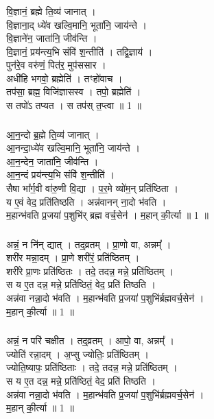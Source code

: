 \subsubsection{}
वि॒ज्ञानं॒ ब्रह्मे  ति॒व्य॑ जानात् ।\\
वि॒ज्ञाना॒द् ध्ये॑व खल्वि॒मानि॒ भूता॑नि॒ जाय॑न्ते । \\
वि॒ज्ञाने॑न॒ जाता॑नि॒ जीव॑न्ति ।\\
वि॒ज्ञानं॒ प्रय॑न्त्य॒भि संवि॑ श॒न्तीति॑ । तद्वि॒ज्ञाय॑ ।\\
पुन॑रे॒व वरु॑णं॒ पित॑र॒ मुप॑ससार ।\\
अधी॑हि भगवो॒ ब्रह्मेति॑ । तꣳहो॑वाच ।\\
तप॑सा॒ ब्रह्म॒ विजि॑ज्ञासस्व । तपो॒ ब्रह्मेति॑ ।\\
स तपो॑ऽ तप्यत । स तप॑स् त॒प्त्वा ॥ 1 ॥\\
\subsubsection{}
आ॒न॒न्दो ब्र॒ह्मे  ति॒व्य॑ जानात् ।\\
आ॒नन्दा॒ध्ये॑व खल्वि॒मानि॒ भूता॑नि॒ जाय॑न्ते । \\
आ॒न॒न्देन॒ जाता॑नि॒ जीव॑न्ति ।\\
आ॒न॒न्दं प्रय॑न्त्य॒भि संवि॑ श॒न्तीति॑ ।\\
सैषा भा᳚र्ग॒वी वा॑रु॒णी वि॒द्या । प॒र॒मे व्यो॑म॒न् प्रति॑ष्ठिता ।\\
य ए॒वं वेद॒ प्रति॑तिष्ठति । अन्न॑वानन् ना॒दो भ॑वति ।\\
म॒हान्भ॑वति प्र॒जया॑ प॒शुभि॑र् ब्रह्म वर्च॒सेन॑ । म॒हान् की॒र्त्या ॥ 1 ॥\\
\subsubsection{}
अन्नं॒ न नि॑न् द्यात् । तद्॒व्रतम् । प्रा॒णो वा, अन्नम्᳚ ।\\
शरी॑र मन्ना॒दम् । प्रा॒णे शरी॑रं॒ प्रति॑ष्ठितम् ।\\
शरी॑रे प्रा॒णः प्रति॑ष्ठितः । तदे॒ तदन्न॒ मन्ने॒ प्रति॑ष्ठितम् ।\\
स य ए॒त दन्न॒ मन्ने॒ प्रति॑ष्ठितं॒ वेद॒ प्रति॑ तिष्ठति ।\\
अन्न॑वा नन्ना॒दो भ॑वति । म॒हान्भ॑वति प्र॒जया॑ प॒शुभि॑र्ब्रह्मवर्च॒सेन॑ । \\
म॒हान् की॒र्त्या ॥ 1 ॥\\
\subsubsection{}
अन्नं॒ न परि॑ चक्षीत । तद्॒व्रतम् । आपो॒ वा, अन्नम्᳚ ।\\
ज्योति॑ रन्ना॒दम् । अ॒प्सु ज्योतिः॒ प्रति॑ष्ठितम् ।\\
ज्योति॒ष्यापः॒ प्रति॑ष्ठिताः । तदे॒ तदन्न॒ मन्ने॒ प्रति॑ष्ठितम् ।\\
स य ए॒त दन्न॒ मन्ने॒ प्रति॑ष्ठितं॒ वेद॒ प्रति॑ तिष्ठति ।\\
अन्न॑वा नन्ना॒दो भ॑वति । म॒हान्भ॑वति प्र॒जया॑ प॒शुभि॑र्ब्रह्मवर्च॒सेन॑ । \\
म॒हान् की॒र्त्या ॥ 1 ॥\\
